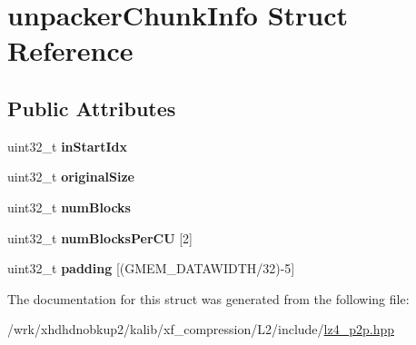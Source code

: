 \hypertarget{structunpackerChunkInfo}{\section{unpacker\-Chunk\-Info Struct Reference}
\label{structunpackerChunkInfo}
}
\subsection*{Public Attributes}
\begin{DoxyCompactItemize}
\item 
\hypertarget{structunpackerChunkInfo_ae0cfab878c9220194e5bd27d8cda4066}{uint32\-\_\-t {\bfseries in\-Start\-Idx}}\label{structunpackerChunkInfo_ae0cfab878c9220194e5bd27d8cda4066}

\item 
\hypertarget{structunpackerChunkInfo_ae0c63fe150a2862355abaa9105ccfa8b}{uint32\-\_\-t {\bfseries original\-Size}}\label{structunpackerChunkInfo_ae0c63fe150a2862355abaa9105ccfa8b}

\item 
\hypertarget{structunpackerChunkInfo_aa5dd30f0efca1cd503347e400f002d75}{uint32\-\_\-t {\bfseries num\-Blocks}}\label{structunpackerChunkInfo_aa5dd30f0efca1cd503347e400f002d75}

\item 
\hypertarget{structunpackerChunkInfo_aa298c12f402078e95acef4dfac17c1e1}{uint32\-\_\-t {\bfseries num\-Blocks\-Per\-C\-U} \mbox{[}2\mbox{]}}\label{structunpackerChunkInfo_aa298c12f402078e95acef4dfac17c1e1}

\item 
\hypertarget{structunpackerChunkInfo_a27ef665c9e23274a53566dc78e489dd9}{uint32\-\_\-t {\bfseries padding} \mbox{[}(G\-M\-E\-M\-\_\-\-D\-A\-T\-A\-W\-I\-D\-T\-H/32)-\/5\mbox{]}}\label{structunpackerChunkInfo_a27ef665c9e23274a53566dc78e489dd9}

\end{DoxyCompactItemize}


The documentation for this struct was generated from the following file\-:\begin{DoxyCompactItemize}
\item 
/wrk/xhdhdnobkup2/kalib/xf\-\_\-compression/\-L2/include/\hyperlink{lz4__p2p_8hpp}{lz4\-\_\-p2p.\-hpp}\end{DoxyCompactItemize}
